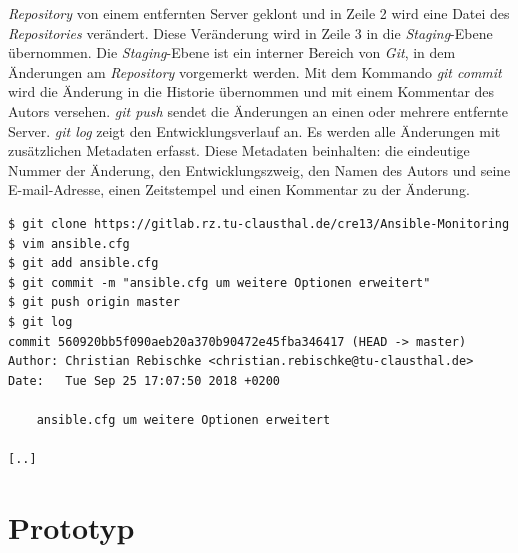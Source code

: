 \documentclass[titlepage]{report}
\begin{document}
\emph{Repository} von einem entfernten Server geklont und in Zeile 2
wird eine Datei des \emph{Repositories} verändert. Diese Veränderung
wird in Zeile 3 in die \emph{Staging}\hyp{}Ebene übernommen. Die
\emph{Staging}\hyp{}Ebene ist ein interner Bereich von \emph{Git}, in dem
Änderungen am \emph{Repository} vorgemerkt werden\cite{PROGIT}. Mit dem
Kommando \emph{git commit} wird die Änderung in die Historie übernommen
und mit einem Kommentar des Autors versehen. \emph{git push} sendet die
Änderungen an einen oder mehrere entfernte Server. \emph{git log} zeigt
den Entwicklungsverlauf an. Es werden alle Änderungen mit
zusätzlichen Metadaten erfasst. Diese Metadaten beinhalten: die eindeutige
Nummer der Änderung, den Entwicklungszweig, den Namen des Autors und
seine E\hyp{}mail\hyp{}Adresse, einen Zeitstempel und einen Kommentar zu der
Änderung.
\begin{minipage}{\linewidth}
\begin{lstlisting}[caption={Beispiele für die Verwendung des
Git-Clients},label={lst:gitexample}]
$ git clone https://gitlab.rz.tu-clausthal.de/cre13/Ansible-Monitoring
$ vim ansible.cfg
$ git add ansible.cfg
$ git commit -m "ansible.cfg um weitere Optionen erweitert"
$ git push origin master
$ git log
commit 560920bb5f090aeb20a370b90472e45fba346417 (HEAD -> master)
Author: Christian Rebischke <christian.rebischke@tu-clausthal.de>
Date:   Tue Sep 25 17:07:50 2018 +0200

    ansible.cfg um weitere Optionen erweitert

[..]
\end{lstlisting}
\end{minipage}
\section{Prototyp}
\end{document}
